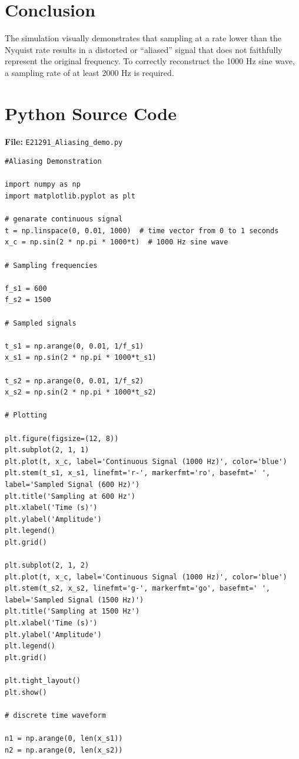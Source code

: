 \documentclass[11pt, a4paper]{article}
\begin{document}
\section{Conclusion}
The simulation visually demonstrates that sampling at a rate lower than the Nyquist rate results in a distorted or ``aliased'' signal that does not faithfully represent the original frequency. To correctly reconstruct the 1000 Hz sine wave, a sampling rate of at least 2000 Hz is required.

\appendix
\section{Python Source Code}
\textbf{File:} \texttt{E21291\_Aliasing\_demo.py}
\begin{lstlisting}[caption={Aliasing Demonstration -- Assignment 1}]
#Aliasing Demonstration

import numpy as np
import matplotlib.pyplot as plt

# genarate continuous signal 
t = np.linspace(0, 0.01, 1000)  # time vector from 0 to 1 seconds
x_c = np.sin(2 * np.pi * 1000*t)  # 1000 Hz sine wave

# Sampling frequencies

f_s1 = 600
f_s2 = 1500

# Sampled signals

t_s1 = np.arange(0, 0.01, 1/f_s1)
x_s1 = np.sin(2 * np.pi * 1000*t_s1)

t_s2 = np.arange(0, 0.01, 1/f_s2)
x_s2 = np.sin(2 * np.pi * 1000*t_s2)

# Plotting

plt.figure(figsize=(12, 8))
plt.subplot(2, 1, 1)
plt.plot(t, x_c, label='Continuous Signal (1000 Hz)', color='blue')
plt.stem(t_s1, x_s1, linefmt='r-', markerfmt='ro', basefmt=' ', label='Sampled Signal (600 Hz)')
plt.title('Sampling at 600 Hz')
plt.xlabel('Time (s)')
plt.ylabel('Amplitude')
plt.legend()
plt.grid()

plt.subplot(2, 1, 2)
plt.plot(t, x_c, label='Continuous Signal (1000 Hz)', color='blue')
plt.stem(t_s2, x_s2, linefmt='g-', markerfmt='go', basefmt=' ', label='Sampled Signal (1500 Hz)')
plt.title('Sampling at 1500 Hz')
plt.xlabel('Time (s)')
plt.ylabel('Amplitude')
plt.legend()
plt.grid()

plt.tight_layout()
plt.show()

# discrete time waveform

n1 = np.arange(0, len(x_s1))
n2 = np.arange(0, len(x_s2))


\end{lstlisting}
\end{document}
